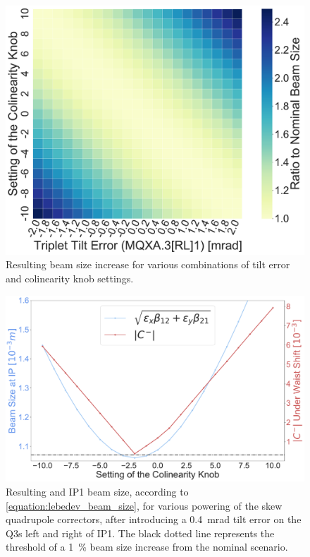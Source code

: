 \begin{figure}[!htb]
    \centering
    \includegraphics*[width=0.99\columnwidth]{Figures/Chapter4/beam_size_colin_compensation.pdf}
    \caption{Resulting beam size increase for various combinations of tilt error and colinearity knob settings.}
    \label{fig:beam_size_comp}
\end{figure}

\begin{figure}[!htb]
    \centering
    \includegraphics*[width=0.99\columnwidth]{Figures/Chapter4/colin_correct_dqmin_lebedev_tilt4e-4.pdf}
    \caption{Resulting \AbsCminus and IP1 beam size, according to \cref{equation:lebedev_beam_size}, for various powering of the skew quadrupole correctors, after introducing a \qty{0.4}{\milli\radian} tilt error on the Q3s left and right of IP1. The black dotted line represents the threshold of a \qty{1}{\percent} beam size increase from the nominal scenario.}
    \label{fig:colin_correction_dqmin_lebedev}
\end{figure}

